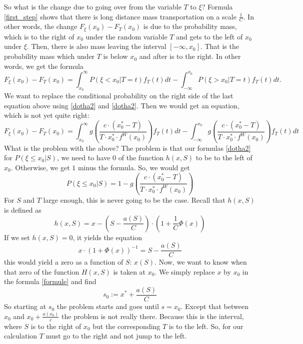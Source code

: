 \documentclass[12pt]{amsart}
\theoremstyle{definition}
\numberwithin{equation}{section}
\numberwithin{equation}{section}
\theoremstyle{remark}
\numberwithin{equation}{section}
\begin{document}
So what is the change due to going over from the variable $T$ to $\xi$? Formula \ref{first_step} shows that there is long distance mass transportation on a scale $\frac{1}{C}$. In other words, the change $F_\xi(x_0)-F_T(x_0)$ is due to the probability mass, which is to the right of $x_0$ under the random variable $T$ and gets to the left of $x_0$ under $\xi$. Then, there is also mass leaving the interval $[-\infty,x_0]$. That is the probability mass which under $T$ is below $x_0$ and after is to the right.
In other words, we get the formula
$$F_\xi(x_0)-F_T(x_0)=\int_{x_0}^\infty   P(\xi<x_0|T=t)       f_T(t)dt-\int_{-\infty}^{x_0}    P(\xi>x_0|T=t)f_T(t)dt.$$
We want to replace the conditional probability on the right side of the last equation above using \ref{dotha2} and
\ref{dotha2}. Then we would get an equation, which is not yet quite right:
\begin{equation}
\label{expression_incorrect}
F_\xi(x_0)-F_T(x_0)=\int_{x_0}^\infty   g\left(\frac{c\cdot (x_0^*-T)}{T\cdot x_0^*\cdot f^W(x_0)}\right )
  f_T(t)dt-\int_{-\infty}^{x_0}    g\left(\frac{c\cdot (x_0^*-T)}{T\cdot x_0^*\cdot f^W(x_0)}\right)f_T(t)dt
\end{equation}
What is the problem with the above?  The problem is that our formulas \ref{dotha2} for $P(\xi\leq x_0|S)$, we need to have $0$ of the function $h(x,S)$ to be to the left of $x_0$. Otherwise, we get $1$ minus the formula. So, we would get
$$P(\xi\leq x_0|S)=1-g\left(\frac{c\cdot (x_0^*-T)}{T\cdot x_0^*\cdot f^W(x_0)}\right )$$
For $S$ and $T$ large enough, this is never going to be the case.
Recall that $h(x,S)$ is defined as
$$h(x,S)=x-(S-\frac{a(S)}{C})\cdot\left(1+\frac{1}{C}\Phi(x)\right)$$
If we set $h(x,S)=0$, it yields the equation
	\begin{equation}
	\label{formule}
	x\cdot (1+\Phi(x))^{-1}=S-\frac{a(S)}{C}
	\end{equation}
	this would yield a zero as a function of $S$: $x(S)$. Now, we want to know when
	that zero of the function $H(x,S) $ is taken at $x_0$. We simply replace
	$x$ by $x_0$ in the formula \ref{formule} and find
\begin{equation}
\label{boundary}
s_0:=x^*+\frac{a(S)}{C}
\end{equation}
So starting at $s_0$ the problem starts and goes until $s=x_0$.
Except that between $x_0$ and $x_0+\frac{a(x_0)}{c}$ the problem is not really there. Because this is the interval, where $S$ is to the right of $x_0$ but the corresponding $T$ is to the left. So, for our calculation $T$ must go to the right and not jump to the left.
\end{document}
